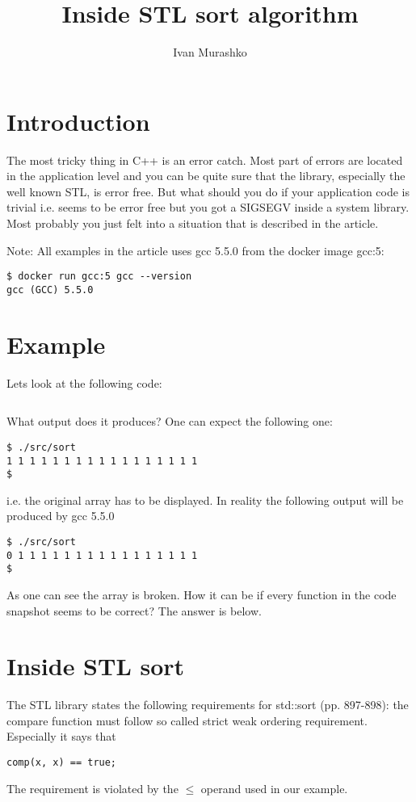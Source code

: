 \documentclass[14pt,a4paper]{article}
\title{Inside STL sort algorithm}
\author{Ivan Murashko}
\date{}
\begin{document}
\maketitle

\section*{Introduction}
The most tricky thing in C++ is an error catch. Most part of errors
are located in the application level and you can be quite sure that
the library, especially the well known STL, is error free. But what
should you do if your application code is trivial i.e. seems to be
error free but you got a SIGSEGV inside a system library. Most
probably you just felt into a situation that is described in the
article. 

Note: All examples in the article uses gcc 5.5.0 from the docker image
gcc:5: 
\begin{verbatim}
$ docker run gcc:5 gcc --version
gcc (GCC) 5.5.0
\end{verbatim}


\section{Example}
Lets look at the following code:
\inputminted{c++}{./src/sort.cpp}
What output does it produces? One can expect the following one:
\begin{verbatim}
$ ./src/sort
1 1 1 1 1 1 1 1 1 1 1 1 1 1 1 1 1
$
\end{verbatim}
i.e. the original array has to be displayed. In reality the following
output will be produced by gcc 5.5.0 
\begin{verbatim}
$ ./src/sort
0 1 1 1 1 1 1 1 1 1 1 1 1 1 1 1 1
$
\end{verbatim}
As one can see the array is broken. How it can be if every
function in the code snapshot seems to be correct? The answer is
below. 

\section{Inside STL sort}

The STL library states the following requirements for std::sort 
\cite{ISO:2013:IIP}(pp. 897-898): the compare function must follow so
called strict weak ordering requirement. Especially it
says that 
\begin{verbatim}
comp(x, x) == true;
\end{verbatim}
The requirement is violated
by the $\le$ operand used in our example.  
\end{document}
